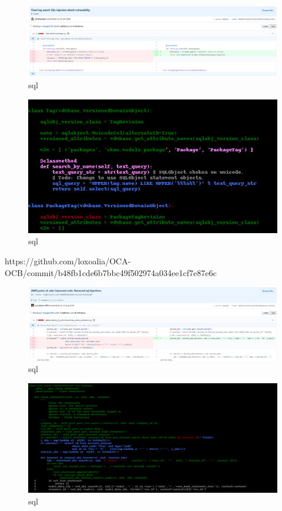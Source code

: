 \documentclass[
a4paper,
pagesize,
pdftex,
12pt,
twoside, %
BCOR=5mm, %
ngerman,
fleqn,
final,
]{scrartcl}
\begin{document}
\begin{figure}[h]
	\centering
	\includegraphics[width=\linewidth]{Images/sql1}
	\caption{sql}
	\label{fig:sql1}
\end{figure}
\begin{figure}[h]
	\centering
	\includegraphics[width=\linewidth]{Images/sql1r}
	\caption{sql}
	\label{fig:sql1r}
\end{figure}


https://github.com/loxoalia/OCA-OCB/commit/b48fb1cde6b7bbc49f502974a034ee1cf7e87e6c


\begin{figure}[h]
	\centering
	\includegraphics[width=\linewidth]{Images/sql2}
	\caption{sql}
	\label{fig:sql2}
\end{figure}
\begin{figure}[h]
	\centering
	\includegraphics[width=\linewidth]{Images/sql2r}
	\caption{sql}
	\label{fig:sql2r}
\end{figure}
\end{document}
